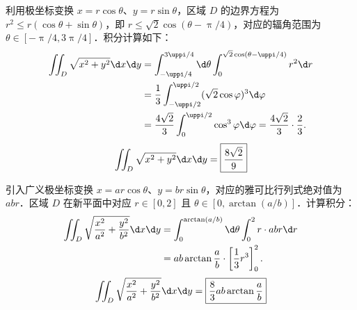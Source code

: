\begin{solution}

    利用极坐标变换 $x = r \cos \theta$、$y = r \sin \theta$，区域 $D$ 的边界方程为 $r^2 \leqslant r(\cos \theta + \sin \theta)$，即 $r \leqslant \sqrt{2} \cos(\theta - \uppi/4)$，对应的辐角范围为 $\theta \in [-\uppi/4, 3\uppi/4]$．积分计算如下：
    \begin{equation}
        \begin{aligned}
            \iint_D \sqrt{x^2+y^2} \d x \d y & = \int_{-\uppi/4}^{3\uppi/4} \d \theta \int_0^{\sqrt{2}\cos(\theta - \uppi/4)} r^2 \d r                   \\
                                             & = \frac{1}{3} \int_{-\uppi/2}^{\uppi/2} (\sqrt{2}\cos \varphi)^3 \d \varphi \label{eq:int-1-step}         \\
                                             & = \frac{4\sqrt{2}}{3} \int_0^{\uppi/2} \cos^3 \varphi \d \varphi = \frac{4\sqrt{2}}{3} \cdot \frac{2}{3}.
        \end{aligned}
    \end{equation}
    \begin{equation}
        \iint_D \sqrt{x^2+y^2} \d x \d y = \boxed{\frac{8\sqrt{2}}{9}}
    \end{equation}


    引入广义极坐标变换 $x = ar\cos\theta$、$y = br\sin\theta$，对应的雅可比行列式绝对值为 $abr$．区域 $D$ 在新平面中对应 $r \in [0, 2]$ 且 $\theta \in [0, \arctan(a/b)]$．计算积分：
    \begin{equation}
        \begin{aligned}
            \iint_D \sqrt{\frac{x^2}{a^2} + \frac{y^2}{b^2}} \d x \d y & = \int_0^{\arctan(a/b)} \d \theta \int_0^2 r \cdot abr \d r      \\
                                                                       & = ab \arctan\frac{a}{b} \cdot \left[ \frac{1}{3}r^3 \right]_0^2.
        \end{aligned}
    \end{equation}
    \begin{equation}
        \iint_D \sqrt{\frac{x^2}{a^2} + \frac{y^2}{b^2}} \d x \d y = \boxed{\frac{8}{3}ab \arctan\frac{a}{b}}
    \end{equation}



\end{solution}
